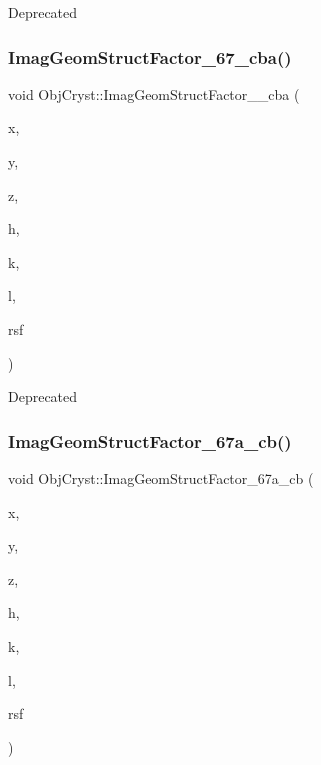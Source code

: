 \begin{DoxyRefDesc}{Deprecated}
\item[\mbox{\hyperlink{deprecated__deprecated000017}{Deprecated}}]\end{DoxyRefDesc}
\mbox{\label{namespace_obj_cryst_a3efc70018737c3fa09174b5888240953}} 
\subsubsection{\texorpdfstring{ImagGeomStructFactor\_67\_cba()}{ImagGeomStructFactor\_67\_cba()}}
{\footnotesize\ttfamily void Obj\+Cryst\+::\+Imag\+Geom\+Struct\+Factor\+\_\+\_\+cba (\begin{DoxyParamCaption}\item[{const R\+E\+AL}]{x,  }\item[{const R\+E\+AL}]{y,  }\item[{const R\+E\+AL}]{z,  }\item[{const Cryst\+Vector\+\_\+\+R\+E\+AL \&}]{h,  }\item[{const Cryst\+Vector\+\_\+\+R\+E\+AL \&}]{k,  }\item[{const Cryst\+Vector\+\_\+\+R\+E\+AL \&}]{l,  }\item[{Cryst\+Vector\+\_\+\+R\+E\+AL \&}]{rsf }\end{DoxyParamCaption})}

\begin{DoxyRefDesc}{Deprecated}
\item[\mbox{\hyperlink{deprecated__deprecated000020}{Deprecated}}]\end{DoxyRefDesc}
\mbox{\label{namespace_obj_cryst_a4b2352507c09881913ff909efae05c6f}} 
\subsubsection{\texorpdfstring{ImagGeomStructFactor\_67a\_cb()}{ImagGeomStructFactor\_67a\_cb()}}
{\footnotesize\ttfamily void Obj\+Cryst\+::\+Imag\+Geom\+Struct\+Factor\+\_\+67a\+\_\+cb (\begin{DoxyParamCaption}\item[{const R\+E\+AL}]{x,  }\item[{const R\+E\+AL}]{y,  }\item[{const R\+E\+AL}]{z,  }\item[{const Cryst\+Vector\+\_\+\+R\+E\+AL \&}]{h,  }\item[{const Cryst\+Vector\+\_\+\+R\+E\+AL \&}]{k,  }\item[{const Cryst\+Vector\+\_\+\+R\+E\+AL \&}]{l,  }\item[{Cryst\+Vector\+\_\+\+R\+E\+AL \&}]{rsf }\end{DoxyParamCaption})}

